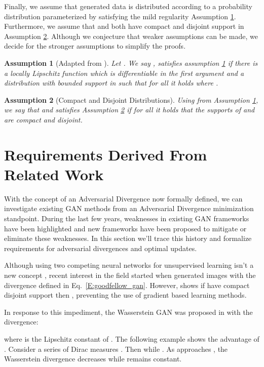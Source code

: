 \documentclass{article}
\newtheorem{assumption}{Assumption}
\begin{document}
Finally, we assume that generated data is distributed according to a probability distribution 
parameterized by  satisfying the mild regularity Assumption \ref{A:1}. Furthermore, we assume that  and  both have
compact and disjoint support in Assumption \ref{A:2}. Although we conjecture that weaker assumptions can be made, we decide for the stronger assumptions
to simplify the proofs.

\begin{assumption}[Adapted from \cite{arjovsky2017wasserstein}]\label{A:1}
 Let . We say , 
 satisfies assumption \ref{A:1} if there is a locally Lipschitz function 
 which is differentiable in the first argument
 and a distribution  with bounded support in  such that
 for all  it holds 
 where .
\end{assumption}

\begin{assumption}[Compact and Disjoint Distributions]\label{A:2}
 Using  from Assumption \ref{A:1}, we say that  and 
 satisfies Assumption \ref{A:2} if for all
  it holds that the supports of
  and  are compact and disjoint.
\end{assumption}


\section{Requirements Derived From Related Work}\label{S:related_work}
With the concept of an Adversarial Divergence now formally defined, we can investigate
existing GAN methods from an Adversarial Divergence minimization standpoint.
 During the last few years, weaknesses in existing GAN frameworks have been highlighted and new frameworks have been
 proposed to mitigate or eliminate these weaknesses. In this section we'll trace this history and
 formalize requirements for adversarial divergences and optimal updates.

 Although using two competing neural networks for unsupervised learning isn't a new concept \cite{schmidhuber1992learning},
 recent interest in the field started when \cite{goodfellow2014generative} generated images with the divergence 
 defined in Eq.\ \ref{E:goodfellow_gan}.
 However, \cite{arjovsky2017towards} shows if  have compact disjoint support then
 , preventing the use of gradient based learning methods.

 In response to this impediment, the Wasserstein GAN was proposed in \cite{arjovsky2017wasserstein} with the divergence:
 
 where  is the Lipschitz constant of .
 The following example shows the advantage of . Consider a series of Dirac measures .
 Then  while . As  approaches
 , the Wasserstein divergence decreases while  remains constant.
\end{document}
